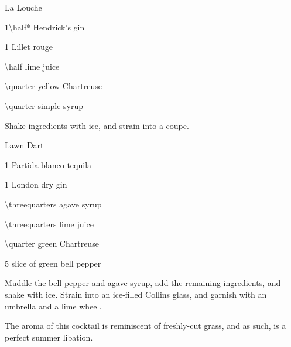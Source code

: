 \begin{PDTCocktail}{La Louche}
	\begin{Ingredients}
	\item \SI{1\half*}{\oz} Hendrick's gin
	\item \SI{1}{\oz} Lillet rouge
	\item \SI{\half}{\oz} lime juice
	\item \SI{\quarter}{\oz} yellow Chartreuse
	\item \SI{\quarter}{\oz} simple syrup
	\end{Ingredients}
	
	\begin{Instructions}
	Shake ingredients with ice, and strain into a coupe.
	\end{Instructions}
\end{PDTCocktail}

\begin{PDTCocktail}{Lawn Dart}
	\begin{Ingredients}\normalsize
	\item \SI{1}{\oz} Partida blanco tequila
	\item \SI{1}{\oz} London dry gin
	\item \SI{\threequarters}{\oz} agave syrup
	\item \SI{\threequarters}{\oz} lime juice
	\item \SI{\quarter}{\oz} green Chartreuse
	\item \SI{5}{\inch} slice of green bell pepper
	\end{Ingredients}
	
	\begin{Instructions}\small
	Muddle the bell pepper and agave syrup, add the remaining ingredients, and shake with ice.  Strain into an ice-filled Collins glass, and garnish with an umbrella and a lime wheel.
	
	The aroma of this cocktail is reminiscent of freshly-cut grass, and as such, is a perfect summer libation.
	\end{Instructions}
\end{PDTCocktail}

